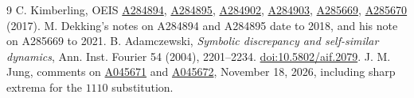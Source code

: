 \documentclass[11pt]{article}
\newcommand{\oeis}[1]{\href{https://oeis.org/#1}{\textup{#1}}}
\begin{document}
\begin{thebibliography}{9}
 C. Kimberling, OEIS \oeis{A284894}, \oeis{A284895},
\oeis{A284902}, \oeis{A284903}, \oeis{A285669}, \oeis{A285670} (2017).
M. Dekking's notes on A284894 and A284895 date to 2018, and his note on
A285669 to 2021.
 B. Adamczewski, \emph{Symbolic discrepancy and self-similar
dynamics}, Ann. Inst. Fourier 54 (2004), 2201--2234.
\href{https://doi.org/10.5802/aif.2079}{doi:10.5802/aif.2079}.
 J. M. Jung, comments on \oeis{A045671} and \oeis{A045672},
November 18, 2026, including sharp extrema for the $1110$ substitution.
\end{thebibliography}
\end{document}

